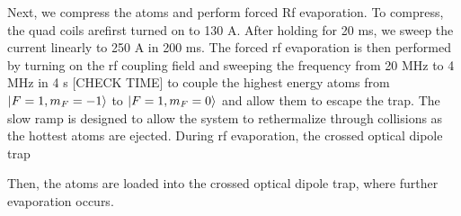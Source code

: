 Next, we compress the atoms and perform forced Rf evaporation. To compress, the quad coils arefirst turned on to 130 A. After holding for 20 ms, we sweep the current linearly to 250 A in 200 ms. The forced rf evaporation is then performed by turning on the rf coupling field and sweeping the frequency from 20 MHz to 4 MHz in 4 s [CHECK TIME] to couple the highest energy atoms from $\mathinner{|{F=1,m_F=-1}\rangle}$ to $\mathinner{|{F=1,m_F=0}\rangle}$ and allow them to escape the trap. The slow ramp is designed to allow the system to rethermalize through collisions as the hottest atoms are ejected. During rf evaporation, the crossed optical dipole trap

Then, the atoms are loaded into the crossed optical dipole trap, where further evaporation occurs.

